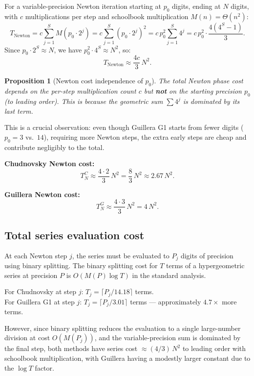 \documentclass[11pt]{article}
\newtheorem{proposition}[theorem]{Proposition}
\begin{document}
For a variable-precision Newton iteration starting at $p_0$ digits, ending at $N$ digits, with $c$ multiplications per step and schoolbook multiplication $M(n) = \Theta(n^2)$:
\begin{equation}\label{eq:newton-total}
T_{\text{Newton}} = c \sum_{j=1}^{S} M(p_0 \cdot 2^j) = c \sum_{j=1}^{S} (p_0 \cdot 2^j)^2 = c \, p_0^2 \sum_{j=1}^{S} 4^j = c \, p_0^2 \cdot \frac{4(4^S - 1)}{3}.
\end{equation}
Since $p_0 \cdot 2^S \approx N$, we have $p_0^2 \cdot 4^S \approx N^2$, so:
\begin{equation}\label{eq:newton-asymp}
T_{\text{Newton}} \approx \frac{4c}{3}\, N^2.
\end{equation}

\begin{proposition}[Newton cost independence of $p_0$]\label{prop:newton-cost}
The total Newton phase cost depends on the per-step multiplication count $c$ but \textbf{not} on the starting precision $p_0$ (to leading order). This is because the geometric sum $\sum 4^j$ is dominated by its last term.
\end{proposition}

This is a crucial observation: even though Guillera G1 starts from fewer digits ($p_0 = 3$ vs.\ $14$), requiring more Newton steps, the extra early steps are cheap and contribute negligibly to the total.

\noindent\textbf{Chudnovsky Newton cost:}
\[
T_N^C \approx \frac{4 \cdot 2}{3}\,N^2 = \frac{8}{3}\,N^2 \approx 2.67\, N^2.
\]

\noindent\textbf{Guillera Newton cost:}
\[
T_N^G \approx \frac{4 \cdot 3}{3}\,N^2 = 4\,N^2.
\]

\subsection{Total series evaluation cost}

At each Newton step $j$, the series must be evaluated to $P_j$ digits of precision using binary splitting. The binary splitting cost for $T$ terms of a hypergeometric series at precision $P$ is $O(M(P) \log T)$ in the standard analysis.

For Chudnovsky at step $j$: $T_j = \lceil P_j / 14.18 \rceil$ terms.\\
For Guillera G1 at step $j$: $T_j = \lceil P_j / 3.01 \rceil$ terms --- approximately $4.7\times$ more terms.

However, since binary splitting reduces the evaluation to a single large-number division at cost $O(M(P_j))$, and the variable-precision sum is dominated by the final step, both methods have series cost $\approx (4/3)\,N^2$ to leading order with schoolbook multiplication, with Guillera having a modestly larger constant due to the $\log T$ factor.
\end{document}
